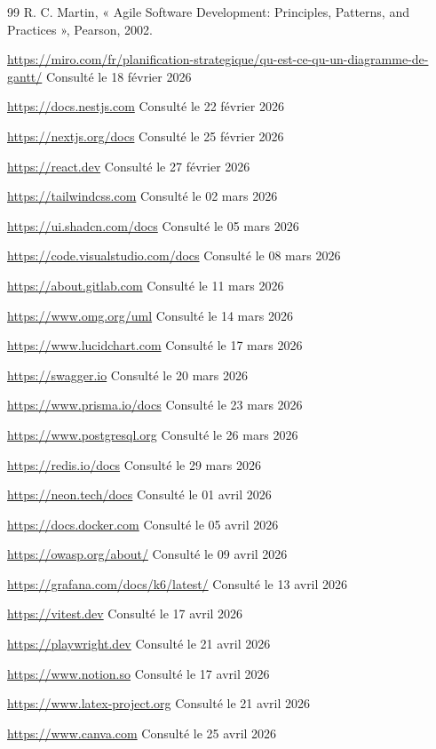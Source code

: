 {\begin{thebibliography}{99}
R. C. Martin, « Agile Software Development: Principles, Patterns, and Practices », Pearson, 2002.

\url{https://miro.com/fr/planification-strategique/qu-est-ce-qu-un-diagramme-de-gantt/} \hfill Consulté le 18 février 2026

\url{https://docs.nestjs.com} \hfill Consulté le 22 février 2026

\url{https://nextjs.org/docs} \hfill Consulté le 25 février 2026

\url{https://react.dev} \hfill Consulté le 27 février 2026

\url{https://tailwindcss.com} \hfill Consulté le 02 mars 2026

\url{https://ui.shadcn.com/docs} \hfill Consulté le 05 mars 2026

\url{https://code.visualstudio.com/docs} \hfill Consulté le 08 mars 2026

\url{https://about.gitlab.com} \hfill Consulté le 11 mars 2026

\url{https://www.omg.org/uml} \hfill Consulté le 14 mars 2026

\url{https://www.lucidchart.com} \hfill Consulté le 17 mars 2026

\url{https://swagger.io} \hfill Consulté le 20 mars 2026

\url{https://www.prisma.io/docs} \hfill Consulté le 23 mars 2026

\url{https://www.postgresql.org} \hfill Consulté le 26 mars 2026

\url{https://redis.io/docs} \hfill Consulté le 29 mars 2026

\url{https://neon.tech/docs} \hfill Consulté le 01 avril 2026

\url{https://docs.docker.com} \hfill Consulté le 05 avril 2026

\url{https://owasp.org/about/} \hfill Consulté le 09 avril 2026

\url{https://grafana.com/docs/k6/latest/} \hfill Consulté le 13 avril 2026

\url{https://vitest.dev} \hfill Consulté le 17 avril 2026

\url{https://playwright.dev} \hfill Consulté le 21 avril 2026

\url{https://www.notion.so} \hfill Consulté le 17 avril 2026

\url{https://www.latex-project.org} \hfill Consulté le 21 avril 2026

\url{https://www.canva.com} \hfill Consulté le 25 avril 2026

\end{thebibliography}
}